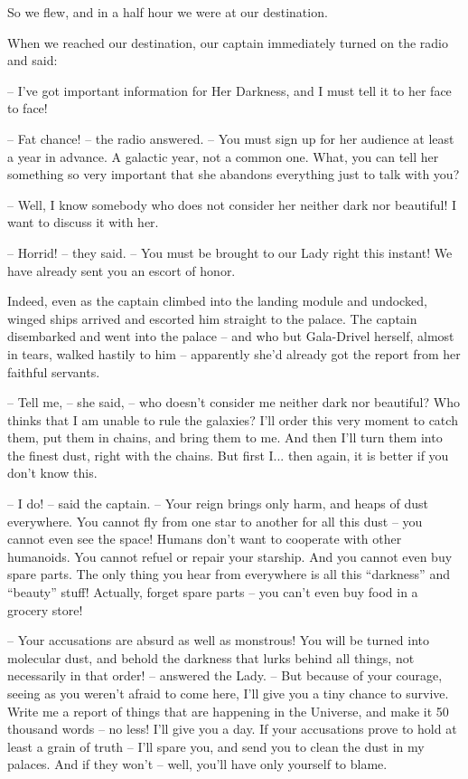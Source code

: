\documentclass[ebook,oneside,final,openright]{memoir}
\begin{document}
So we flew, and in a half hour we were at our destination.\par
\par
When we reached our destination, our captain immediately turned on the radio and said:\par
– I’ve got important information for Her Darkness, and I must tell it to her face to face!\par
– Fat chance! – the radio answered. – You must sign up for her audience at least a year in advance. A galactic year, not a common one. What, you can tell her something so very important that she abandons everything just to talk with you?\par
– Well, I know somebody who does not consider her neither dark nor beautiful! I want to discuss it with her.\par
– Horrid! – they said. – You must be brought to our Lady right this instant! We have already sent you an escort of honor.\par
\par
Indeed, even as the captain climbed into the landing module and undocked, winged ships arrived and escorted him straight to the palace. The captain disembarked and went into the palace – and who but Gala-Drivel herself, almost in tears, walked hastily to him – apparently she’d already got the report from her faithful servants.\par
– Tell me, – she said, – who doesn’t consider me neither dark nor beautiful? Who thinks that I am unable to rule the galaxies? I’ll order this very moment to catch them, put them in chains, and bring them to me. And then I’ll turn them into the finest dust, right with the chains. But first I... then again, it is better if you don’t know this.\par
– I do! – said the captain. – Your reign brings only harm, and heaps of dust everywhere. You cannot fly from one star to another for all this dust – you cannot even see the space! Humans don’t want to cooperate with other humanoids. You cannot refuel or repair your starship. And you cannot even buy spare parts. The only thing you hear from everywhere is all this “darkness” and “beauty” stuff! Actually, forget spare parts – you can’t even buy food in a grocery store!\par
– Your accusations are absurd as well as monstrous! You will be turned into molecular dust, and behold the darkness that lurks behind all things, not necessarily in that order! – answered the Lady. – But because of your courage, seeing as you weren’t afraid to come here, I’ll give you a tiny chance to survive. Write me a report of things that are happening in the Universe, and make it 50 thousand words – no less! I’ll give you a day. If your accusations prove to hold at least a grain of truth – I’ll spare you, and send you to clean the dust in my palaces. And if they won’t – well, you’ll have only yourself to blame.\par
\end{document}
